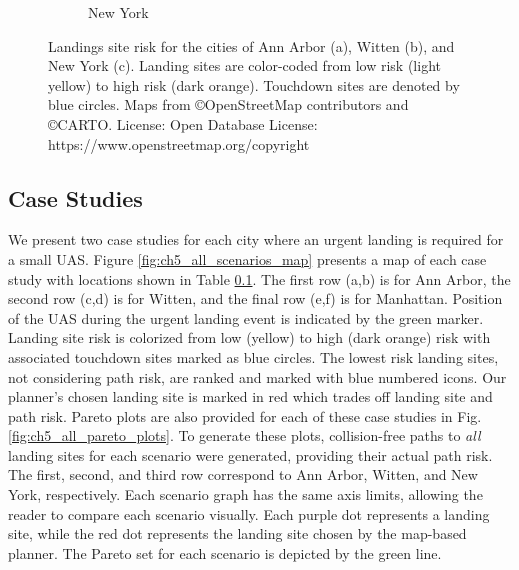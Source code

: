 \begin{figure}[!t]
\begin{subfigure}[b]{0.44\textwidth}
   \caption{New York}\label{fig:ch5_ny_all_risk}
 \end{subfigure}
 \caption[Map of landing site risk]{Landings site risk for the cities of Ann Arbor (a), Witten (b), and New York (c). Landing sites are color-coded from low risk (light yellow) to high risk (dark orange). Touchdown sites are denoted by blue circles. Maps from \copyright OpenStreetMap contributors and \copyright CARTO. License: Open Database License: https://www.openstreetmap.org/copyright}\label{fig:ch5_all_ls_risk}
\end{figure}


\subsection{Case Studies}\label{sec:ch5_case_studies}

We present two case studies for each city where an urgent landing is required for a small UAS.  Figure \ref{fig:ch5_all_scenarios_map} presents a map of each case study with locations shown in Table \ref{sec:ch5_case_studies}. The first row (a,b) is for Ann Arbor, the second row (c,d) is for Witten, and the final row (e,f) is for Manhattan. Position of the UAS during the urgent landing event is indicated by the green marker. Landing site risk is colorized from low (yellow) to high (dark orange) risk with associated touchdown sites marked as blue circles. The lowest risk landing sites, not considering path risk, are ranked and marked with blue numbered icons. Our planner's chosen landing site is marked in red which trades off landing site and path risk. 
Pareto plots are also provided for each of these case studies in Fig. \ref{fig:ch5_all_pareto_plots}. To generate these plots, collision-free paths to \textit{all} landing sites for each scenario were generated, providing their actual path risk. The first, second, and third row correspond to Ann Arbor, Witten, and New York, respectively.  Each scenario graph has the same axis limits, allowing the reader to compare each scenario visually. Each purple dot represents a landing site, while the red dot represents the landing site chosen by the map-based planner. The Pareto set for each scenario is depicted by the green line. 


